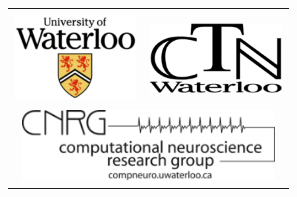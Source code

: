 \documentclass[landscape,final,a0paper,fontscale=0.285]{baposter}
\begin{document}
\begin{poster}
{  }
  {
    \begin{tabular}{cc}
      \relax\\
      \includegraphics[height=6.0em]{uwaterloo.png} &
      \includegraphics[height=5.0em]{ctn.png}\\
      \multicolumn{2}{c}{
        \includegraphics[height=5.0em]{cnrg.png}}
    \end{tabular}
  }

    \newcommand{\colouredcircle}{%
      \tikz{\useasboundingbox (-0.2em,-0.32em) rectangle(0.2em,0.32em); \draw[draw=black,fill=headerfade,line width=0.03em] (0,0) circle(0.18em);}}

    \newenvironment{blockitemize}
    {%
      \begin{minipage}{\columnwidth - 2em}
      \begin{itemize}
        \setlength{\itemsep}{0.3em}

        \raggedright
    }{
      \end{itemize}
      \end{minipage}
    }


\end{poster}
\end{document}
